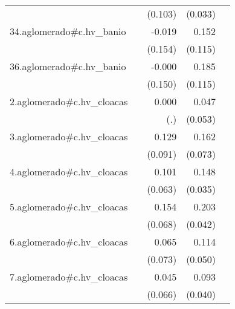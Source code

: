 {\begin{longtable}{l*{4}{D{.}{.}{-1}}}
            &                     &     (0.103)         &     (0.033)         &                     \\
\addlinespace
34.aglomerado#c.hv\_banio&                     &      -0.019         &       0.152         &                     \\
            &                     &     (0.154)         &     (0.115)         &                     \\
\addlinespace
36.aglomerado#c.hv\_banio&                     &      -0.000         &       0.185         &                     \\
            &                     &     (0.150)         &     (0.115)         &                     \\
\addlinespace
2.aglomerado#c.hv\_cloacas&                     &       0.000         &       0.047         &                     \\
            &                     &         (.)         &     (0.053)         &                     \\
\addlinespace
3.aglomerado#c.hv\_cloacas&                     &       0.129         &       0.162\sym{*}  &                     \\
            &                     &     (0.091)         &     (0.073)         &                     \\
\addlinespace
4.aglomerado#c.hv\_cloacas&                     &       0.101         &       0.148\sym{***}&                     \\
            &                     &     (0.063)         &     (0.035)         &                     \\
\addlinespace
5.aglomerado#c.hv\_cloacas&                     &       0.154\sym{*}  &       0.203\sym{***}&                     \\
            &                     &     (0.068)         &     (0.042)         &                     \\
\addlinespace
6.aglomerado#c.hv\_cloacas&                     &       0.065         &       0.114\sym{*}  &                     \\
            &                     &     (0.073)         &     (0.050)         &                     \\
\addlinespace
7.aglomerado#c.hv\_cloacas&                     &       0.045         &       0.093\sym{*}  &                     \\
            &                     &     (0.066)         &     (0.040)         &                     \\

\end{longtable}}
